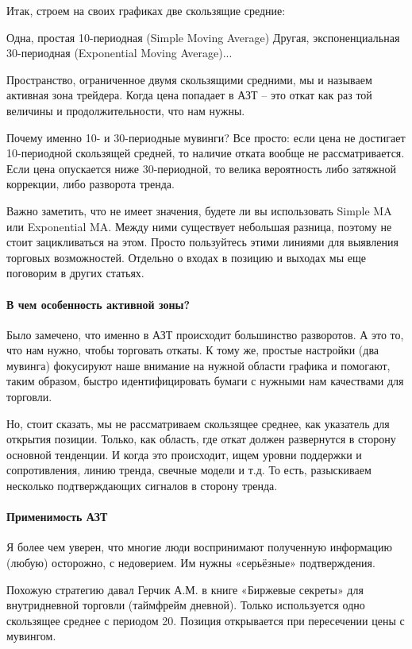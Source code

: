 \documentclass[a5paper]{article}
\begin{document}
Итак, строем на своих графиках две скользящие средние:

    Одна, простая 10-периодная (Simple Moving Average)
    Другая, экспоненциальная 30-периодная (Exponential Moving Average)...

Пространство, ограниченное двумя скользящими средними, мы и называем активная зона трейдера. Когда цена попадает в АЗТ – это откат как раз той величины и продолжительности, что нам нужны.

Почему именно 10- и 30-периодные мувинги? Все просто: если цена не достигает 10-периодной скользящей средней, то наличие отката вообще не рассматривается. Если цена опускается ниже 30-периодной, то велика вероятность либо затяжной коррекции, либо разворота тренда.

Важно заметить, что не имеет значения, будете ли вы использовать
Simple MA или Exponential MA. Между ними существует небольшая разница,
поэтому не стоит зацикливаться на этом. Просто пользуйтесь этими
линиями для выявления торговых возможностей. Отдельно о входах в
позицию и выходах мы еще поговорим в других статьях.

\paragraph{В чем особенность активной зоны?}

Было замечено, что именно в АЗТ происходит большинство разворотов. А это то, что нам нужно, чтобы торговать откаты. К тому же, простые настройки (два мувинга) фокусируют наше внимание на нужной области графика и помогают, таким образом, быстро идентифицировать бумаги с нужными нам качествами для торговли.

Но, стоит сказать, мы не рассматриваем скользящее среднее, как
указатель для открытия позиции. Только, как область, где откат должен
развернутся в сторону основной тенденции. И когда это происходит, ищем
уровни поддержки и сопротивления, линию тренда, свечные модели и
т.д. То есть, разыскиваем несколько подтверждающих сигналов в сторону
тренда.

\paragraph{Применимость АЗТ}

Я более чем уверен, что многие люди воспринимают полученную информацию (любую) осторожно, с недоверием. Им нужны «серьёзные» подтверждения.

Похожую стратегию давал Герчик А.М. в книге «Биржевые секреты» для внутридневной торговли (таймфрейм дневной). Только используется одно скользящее среднее с периодом 20. Позиция открывается при пересечении цены с мувингом.
\end{document}
